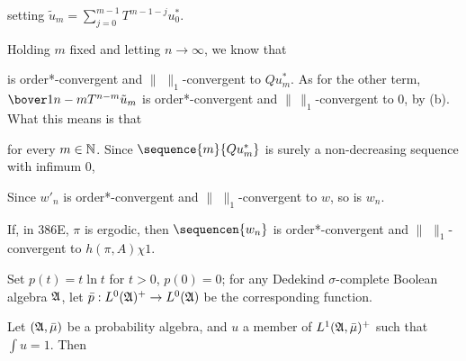 {\noindent setting $\tilde u_m=\sum_{j=0}^{m-1}T^{m-1-j}u_0^*$.
     
Holding $m$ fixed and letting $n\to\infty$, we know that
     
     
\noindent is order*-convergent and $\|\,\,\|_1$-convergent to
$Qu_m^*$.   As for the other term,
$\bover1{n-m}T^{n-m}\tilde u_m$ is order*-convergent and
$\|\,\|_1$-convergent to $0$, by
(b).   What this means is that
     
     
     
\noindent for every $m\in\Bbb N$.   Since $\sequence{m}{Qu_m^*}$ is
surely a non-decreasing sequence with infimum $0$,
     
     
\noindent Since $w'_n$ is order*-convergent and
$\|\,\,\|_1$-convergent to $w$, so is $w_n$.
}%
     
If, in 386E, $\pi$ is ergodic, then
$\sequencen{w_n}$ is order*-convergent and
$\|\,\,\|_1$-convergent to $h(\pi,A)\chi 1$.
     
     
Set $p(t)=t\ln t$ for $t>0$, $p(0)=0$;  for
any Dedekind $\sigma$-complete Boolean algebra $\frak A$, let
$\bar p:L^0(\frak A)^+\to L^0(\frak A)$ be the corresponding
function.   
     
 Let $(\frak A,\bar\mu)$ be a probability algebra,
and $u$ a member of $L^1(\frak A,\bar\mu)^+$ such that $\int u=1$.  Then
     
